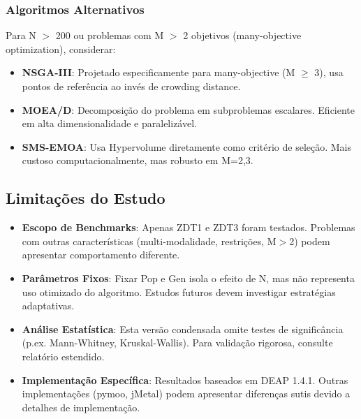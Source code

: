 \subsubsection{Algoritmos Alternativos}
Para N $>$ 200 ou problemas com M $>$ 2 objetivos (many-objective optimization), considerar:
\begin{itemize}
  \item \textbf{NSGA-III}: Projetado especificamente para many-objective (M $\geq$ 3), usa pontos de referência ao invés de crowding distance.
  
  \item \textbf{MOEA/D}: Decomposição do problema em subproblemas escalares. Eficiente em alta dimensionalidade e paralelizável.
  
  \item \textbf{SMS-EMOA}: Usa Hypervolume diretamente como critério de seleção. Mais custoso computacionalmente, mas robusto em M=2,3.
\end{itemize}

\subsection{Limitações do Estudo}
\begin{itemize}
  \item \textbf{Escopo de Benchmarks}: Apenas ZDT1 e ZDT3 foram testados. Problemas com outras características (multi-modalidade, restrições, M$>$2) podem apresentar comportamento diferente.
  
  \item \textbf{Parâmetros Fixos}: Fixar Pop e Gen isola o efeito de N, mas não representa uso otimizado do algoritmo. Estudos futuros devem investigar estratégias adaptativas.
  
  \item \textbf{Análise Estatística}: Esta versão condensada omite testes de significância (p.ex. Mann-Whitney, Kruskal-Wallis). Para validação rigorosa, consulte relatório estendido.
  
  \item \textbf{Implementação Específica}: Resultados baseados em DEAP 1.4.1. Outras implementações (pymoo, jMetal) podem apresentar diferenças sutis devido a detalhes de implementação.
\end{itemize}

